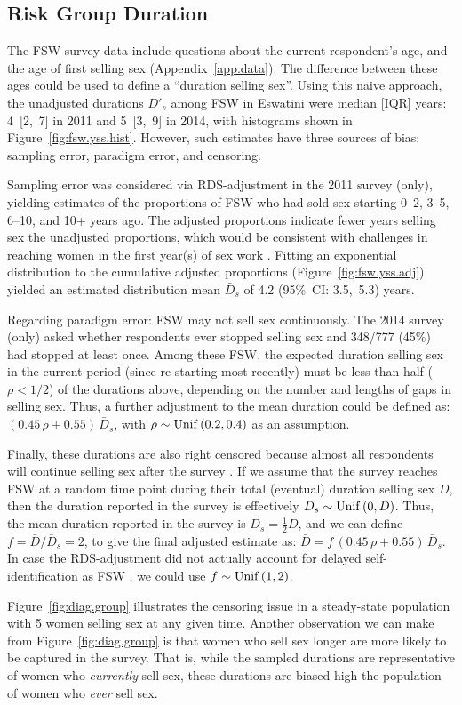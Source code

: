 \subsection{Risk Group Duration}\label{meth.group}
The FSW survey data include questions about
the current respondent's age, and the age of first selling sex (Appendix~\ref{app.data}).
The difference between these ages could be used to define a ``duration selling sex''.
Using this naive approach, the unadjusted durations $D'_s$ among FSW in Eswatini were
median [IQR] years: 4~[2,~7] in 2011 and 5~[3,~9] in 2014,
with histograms shown in Figure~\ref{fig:fsw.yss.hist}.
However, such estimates have three sources of bias:
sampling error, paradigm error, and censoring.
\par
Sampling error was considered via RDS-adjustment in the 2011 survey (only),
yielding estimates of the proportions of FSW
who had sold sex starting 0--2, 3--5, 6--10, and 10+ years ago.
The adjusted proportions indicate fewer years selling sex \vs the unadjusted proportions,
which would be consistent with
challenges in reaching women in the first year(s) of sex work \cite{Cheuk2020}.
Fitting an exponential distribution to the cumulative adjusted proportions
(Figure~\ref{fig:fsw.yss.adj})
yielded an estimated distribution mean $\bar{D}_s$ of 4.2 (95\%~CI: 3.5,~5.3) years.
\par
Regarding paradigm error: FSW may not sell sex continuously.
The 2014 survey (only) asked whether respondents ever stopped selling sex
and 348/777 (45\%) had stopped at least once.
Among these FSW, the expected duration selling sex in the current period
(\ie since re-starting most recently)
must be less than half ($\rho < 1/2$) of the durations above,
depending on the number and lengths of gaps in selling sex.
Thus, a further adjustment to the mean duration could be defined as:
$(0.45\,\rho + 0.55)\,\bar{D}_s$,
with $\rho \sim \mathrm{Unif}\,(0.2,0.4)$ as an assumption.
\par
Finally, these durations are also right censored
because almost all respondents will continue selling sex after the survey \cite{Fazito2012}.
If we assume that the survey reaches FSW
at a random time point during their total (eventual) duration selling sex $D$,
then the duration reported in the survey is effectively $D_s \sim \mathrm{Unif}\,(0,D)$.
Thus, the mean duration reported in the survey is $\bar{D}_s = \frac12 \bar{D}$,
and we can define $f = \bar{D} / \bar{D}_s = 2$,
to give the final adjusted estimate as:
$\bar{D} = f\,(0.45\,\rho + 0.55)\,\bar{D}_s$.
In case the RDS-adjustment did not actually account for
delayed self-identification as FSW \cite{Cheuk2020},
we could use $f \sim \mathrm{Unif}\,(1,2)$.
\par
Figure~\ref{fig:diag.group} illustrates the censoring issue
in a steady-state population with 5 women selling sex at any given time.
Another observation we can make from Figure~\ref{fig:diag.group} is that
women who sell sex longer are more likely to be captured in the survey.
That is, while the sampled durations are representative of women who \emph{currently} sell sex,
these durations are biased high \vs the population of women who \emph{ever} sell sex.
